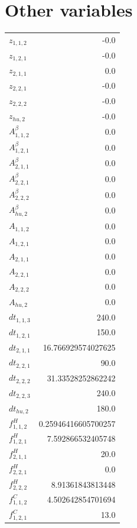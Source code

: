 \documentclass{article}%
\makeatletter
\let\mcnewpage=\newpage%
\newcommand{\TrickSupertabularIntoMulticols}{%
\renewcommand\newpage{%
\if@firstcolumn%
\hrule width\linewidth height0pt%
\columnbreak%
\else%
\mcnewpage%
\fi%
}%
}%
\makeatother
\begin{document}
\section{Other variables}%
\thispagestyle{plain}%
\begin{multicols*}{3}%
\TrickSupertabularIntoMulticols%
%
\begin{supertabular}{lr}%
	$z_{1,1,2}$ & -0.0 \\%
	$z_{1,2,1}$ & -0.0 \\%
	$z_{2,1,1}$ & 0.0 \\%
	$z_{2,2,1}$ & -0.0 \\%
	$z_{2,2,2}$ & -0.0 \\%
	$z_{hu,2}$ & -0.0 \\%
	$A_{1,1,2}^{\beta}$ & 0.0 \\%
	$A_{1,2,1}^{\beta}$ & 0.0 \\%
	$A_{2,1,1}^{\beta}$ & 0.0 \\%
	$A_{2,2,1}^{\beta}$ & 0.0 \\%
	$A_{2,2,2}^{\beta}$ & 0.0 \\%
	$A_{hu,2}^{\beta}$ & 0.0 \\%
	$A_{1,1,2}$ & 0.0 \\%
	$A_{1,2,1}$ & 0.0 \\%
	$A_{2,1,1}$ & 0.0 \\%
	$A_{2,2,1}$ & 0.0 \\%
	$A_{2,2,2}$ & 0.0 \\%
	$A_{hu,2}$ & 0.0 \\%
	$dt_{1,1,3}$ & 240.0 \\%
	$dt_{1,2,1}$ & 150.0 \\%
	$dt_{2,1,1}$ & 16.766929574027625 \\%
	$dt_{2,2,1}$ & 90.0 \\%
	$dt_{2,2,2}$ & 31.33528252862242 \\%
	$dt_{2,2,3}$ & 240.0 \\%
	$dt_{hu,2}$ & 180.0 \\%
	$f_{1,1,2}^{H}$ & 0.25946416605700257 \\%
	$f_{1,2,1}^{H}$ & 7.592866532405748 \\%
	$f_{2,1,1}^{H}$ & 20.0 \\%
	$f_{2,2,1}^{H}$ & 0.0 \\%
	$f_{2,2,2}^{H}$ & 8.91361843813448 \\%
	$f_{1,1,2}^{C}$ & 4.502642854701694 \\%
	$f_{1,2,1}^{C}$ & 13.0 \\%

\end{supertabular}
\end{multicols*}
\end{document}
